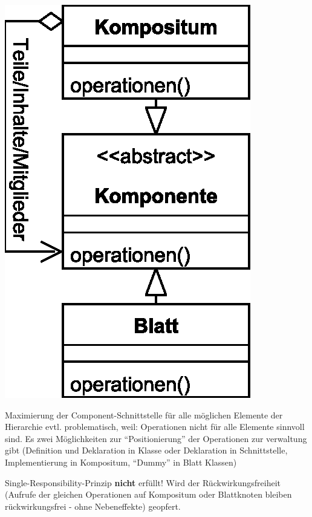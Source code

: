 \documentclass[a4paper,fontsize=9pt, DIV=calc]{scrartcl}
\begin{document}
\begin{multicols}{2}
\begin{minipage}{0.38\columnwidth}
\includegraphics[width=\textwidth]{new/composite}
\end{minipage}\hspace{1mm}%
\begin{minipage}{0.6\columnwidth}
\begin{description}[leftmargin=*]

\item[Realisierung] Maximierung der Component-Schnittstelle für alle möglichen Elemente der Hierarchie evtl. problematisch, weil: Operationen nicht für alle Elemente sinnvoll sind. Es zwei Möglichkeiten zur "`Positionierung"' der Operationen zur verwaltung gibt (Definition und Deklaration in Klasse oder Deklaration in Schnittstelle, Implementierung in Kompositum, "`Dummy"' in Blatt Klassen)
\item[Negativ] Single-Responsibility-Prinzip \textbf{nicht} erfüllt! Wird der Rückwirkungsfreiheit (Aufrufe der gleichen Operationen auf Kompositum oder Blattknoten bleiben rückwirkungsfrei - ohne Nebeneffekte) geopfert. 
\end{description}


\end{minipage}
\end{multicols}
\end{document}
